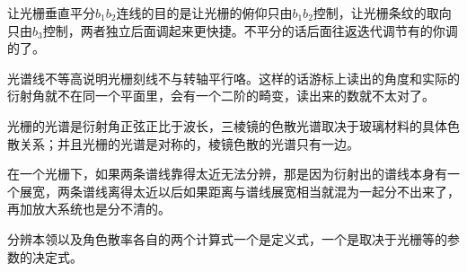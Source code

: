 \documentclass[9pt,UTF8]{ctexart}
\begin{document}
让光栅垂直平分$b_1b_2$连线的目的是让光栅的俯仰只由$b_1b_2$控制，让光栅条纹的取向只由$b_3$控制，两者独立后面调起来更快捷。不平分的话后面往返迭代调节有的你调的了。

光谱线不等高说明光栅刻线不与转轴平行咯。这样的话游标上读出的角度和实际的衍射角就不在同一个平面里，会有一个二阶的畸变，读出来的数就不太对了。

光栅的光谱是衍射角正弦正比于波长，三棱镜的色散光谱取决于玻璃材料的具体色散关系；并且光栅的光谱是对称的，棱镜色散的光谱只有一边。

在一个光栅下，如果两条谱线靠得太近无法分辨，那是因为衍射出的谱线本身有一个展宽，两条谱线离得太近以后如果距离与谱线展宽相当就混为一起分不出来了，再加放大系统也是分不清的。

分辨本领以及角色散率各自的两个计算式一个是定义式，一个是取决于光栅等的参数的决定式。
\end{document}

